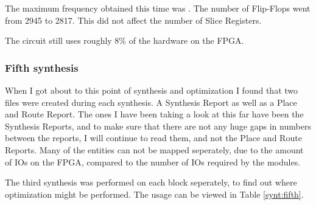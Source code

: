 The maximum frequency obtained this time was . The number of Flip-Flops 
went from 2945 to 2817. This did not affect the number of Slice Registers.

The circuit still uses roughly 8\% of the hardware on the FPGA.

\subsubsection{Fifth synthesis}
When I got about to this point of synthesis and optimization I found that 
two files were created during each synthesis. A Synthesis Report as well 
as a Place and Route Report. The ones I have been taking a look at this far 
have been the Synthesis Reports, and to make sure that there are not any
huge gaps in numbers between the reports, I will continue to read them, 
and not the Place and Route Reports. Many of the entities can not be 
mapped seperately, due to the amount of IOs on the FPGA, compared to the 
number of IOs required by the modules.

The third synthesis was performed on each block seperately, to find out
where optimization might be performed. The usage can be viewed in Table 
\ref{synt:fifth}.

%
\newcommand{\MyIndent}{\hspace*{0.2cm}}%

